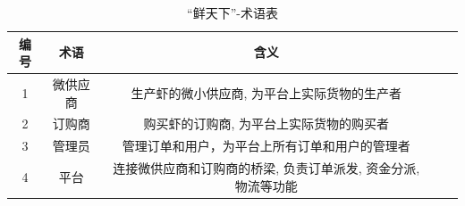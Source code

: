 \begin{table}[h] %
 \begin{adjustwidth}{-1cm}{-1cm}
	\centering
        \label{tab:glossary}
        \caption{“鲜天下”-术语表}
		\begin{tabular}{*{5}{c}}
			\toprule
	 		编号 & 术语 & 含义\\
            \midrule
            1 & 微供应商 & 生产虾的微小供应商, 为平台上实际货物的生产者 \\
            2 & 订购商 & 购买虾的订购商, 为平台上实际货物的购买者 \\
            3 & 管理员 & 管理订单和用户，为平台上所有订单和用户的管理者\\
            4 & 平台 & 连接微供应商和订购商的桥梁, 负责订单派发, 资金分派, 物流等功能\\
			\bottomrule
		\end{tabular}
    \end{adjustwidth}
\end{table}
